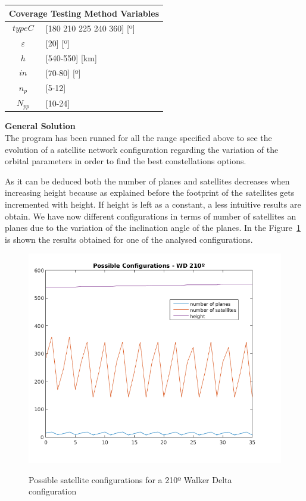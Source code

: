 \begin{table}[H]
\centering
\begin{tabular}{|c|l|}
\hline
\multicolumn{2}{|c|}{Coverage Testing Method Variables}     \\ \hline
$$typeC$$          & {[}180 210 225 240 360{]} {[}º{]} 			 \\ \hline
$\varepsilon$      & {[}20{]} {[}º{]}                         \\ \hline
$$h$$              & {[}540-550{]} {[}km{]}                   \\ \hline
$$in$$             & {[}70-80{]} {[}º{]}                 \\ \hline
$n_{p}$            & {[}5-12{]}                        \\ \hline
$N_{pp}$           & {[}10-24{]}                    \\ \hline
\end{tabular}
\end{table}  

\textbf{General Solution}\\

The program has been runned for all the range specified above to see the evolution of a satellite network configuration regarding the variation of the orbital parameters in order to find the best constellations options.

As it can be deduced both the number of planes and satellites decreases when increasing height because as explained before the footprint of the satellites gets incremented with height.
If height is left as a constant, a less intuitive results are obtain. We have now different configurations in terms of number of satellites an planes due to the variation of the inclination angle of the planes.
In the Figure~\ref{fig:graph120} is shown the results obtained for one of the analysed configurations. \\

\begin{figure}%
	\centering
	\includegraphics[width=.6\textwidth]{./testing/graph210.png}\\
	\caption{Possible satellite configurations for a 210º Walker Delta configuration}
	\label{fig:graph120}
\end{figure}

